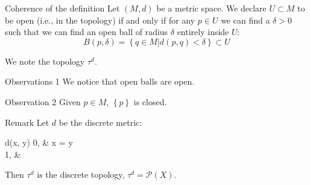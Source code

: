 \documentclass[a4paper]{article}
\begin{document}
\begin{parag}{Coherence of the definition}
    Let $\left(M, d\right)$ be a metric space. We declare $U \subset M$ to be open (i.e., in the topology) if and only if for any $p \in U$ we can find a $\delta > 0$ such that we can find an open ball of radius $\delta$ entirely inside $U$: 
    \[B\left(p, \delta\right) = \left\{q \in M | d\left(p, q\right) < \delta\right\} \subset U\]

    We note the topology $\tau^d$.

    \begin{subparag}{Observations 1}
        We notice that open balls are open.
    \end{subparag}
    
    \begin{subparag}{Observation 2}
        Given $p \in M$, $\left\{p\right\}$ is closed.
    \end{subparag}
    
    \begin{subparag}{Remark}
        Let $d$ be the discrete metric:
        \begin{functionbypart}{d\left(x, y\right)}
            0, &  x = y \\
            1, & 
        \end{functionbypart}
        
        Then $\tau^d$ is the discrete topology, $\tau^d = \mathcal{P}\left(X\right)$.
    \end{subparag}
\end{parag}
\end{document}
